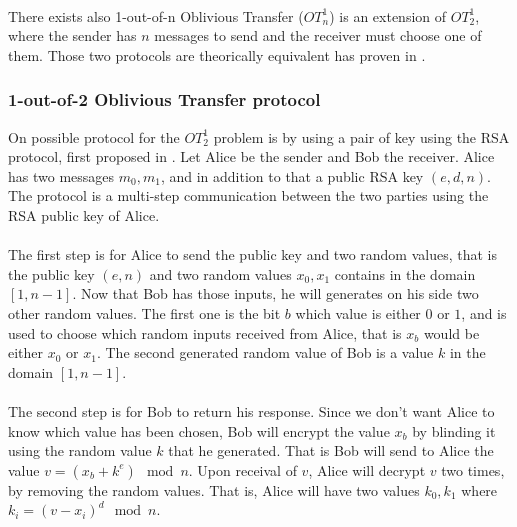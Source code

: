 \documentclass[11pt,a4paper]{article}
\begin{document}
\paragraph{}


There exists also
1-out-of-n Oblivious Transfer ($OT^1_n$) is an extension of $OT^1_2$,
where the sender has $n$ messages to send and the receiver must choose
one of them. Those two protocols are theorically equivalent
has proven in \cite{goos_equivalence_1988, goos_foundations_1998}.


\subsubsection{1-out-of-2 Oblivious Transfer protocol}

\label{sec:ot}

On possible protocol for the $OT^1_2$ problem is by using a pair of
key using the RSA protocol, first proposed in \cite{even_randomized_1985}.
Let Alice be the sender and Bob the receiver.
Alice has two messages $m_0,m_1$, and in addition to that
a public RSA key $(e, d, n)$. The protocol is a multi-step
communication between the two parties using the RSA public key
of Alice.

\paragraph{}

The first step is for Alice
to send the public key and two random values, that is
the public key $(e, n)$ and two random values $x_0, x_1$
contains in the domain $[1, n-1]$. Now that Bob has those inputs,
he will generates on his side two other random values.
The first one is the bit $b$ which value is either $0$ or $1$,
and is used to choose which random inputs received from Alice,
that is $x_b$ would be either $x_0$ or $x_1$. The second
generated random value of Bob is a value $k$ in the domain
$[1, n-1]$.

\paragraph{}


The second step is for Bob to return his response. Since
we don't want Alice to know which value has been chosen, Bob
will encrypt the value $x_b$ by blinding it using the random value $k$
that he generated. That is Bob will send to Alice
the value $v = (x_b + k^e) \mod n$.
Upon receival of $v$, Alice will decrypt $v$ two times, by removing
the random values. That is, Alice will have two values $k_0, k_1$
where $k_i = (v - x_i)^d \mod n$.
\end{document}
